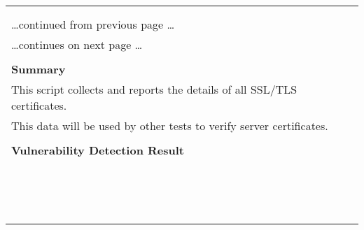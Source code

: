 \documentclass{article}
\begin{document}
\begin{longtable}{|p{}|}
\hline
\rowcolor{gvm_log}{\color{white}{Log (CVSS: 0.0) }}\\
\rowcolor{gvm_log}{\color{white}{NVT: SSL/TLS: Collect and Report Certificate Details}}\\
\hline
\endfirsthead
\hfill\ldots continued from previous page \ldots \\
\hline
\endhead
\hline
\ldots continues on next page \ldots \\
\endfoot
\hline
\endlastfoot
\\
\textbf{Summary}\\
This script collects and reports the details of all SSL/TLS
  certificates.\\
  This data will be used by other tests to verify server certificates.\\

        \hline
        \\
\textbf{Vulnerability Detection Result}\\
\rowcolor{white}{\verb=The following certificate details of the remote service were collected.=}\\
\rowcolor{white}{\verb=Certificate details:=}\\
\rowcolor{white}{\verb=fingerprint (SHA-1)             | DA9C7CB3E91B933B84FD4B8A51B0CF8C35763F02=}\\
\rowcolor{white}{\verb=fingerprint (SHA-256)           | 61FF73A8F85051B08467B262445A409CB9877252E66D0B=}\\
\rowcolor{white}{$\hookrightarrow$\verb=88C9EBDB01108D824E=}\\
\rowcolor{white}{\verb=issued by                       | C=\verb-=-\verb=DE,L=\verb-=-\verb=Osnabrueck,O=\verb-=-\verb=GVM Users,OU=\verb-=-\verb=Certificate A=}\\
\rowcolor{white}{$\hookrightarrow$\verb=uthority for 48f7b451fe6e=}\\
\rowcolor{white}{\verb=public key algorithm            | RSA=}\\
\rowcolor{white}{\verb=public key size (bits)          | 3072=}\\
\rowcolor{white}{\verb=serial                          | 2E9E3F1D5036BD870DBD2CCEF0748CC40AA6EA47=}\\
\rowcolor{white}{\verb=signature algorithm             | sha256WithRSAEncryption=}\\
\rowcolor{white}{\verb=subject                         | C=\verb-=-\verb=DE,L=\verb-=-\verb=Osnabrueck,O=\verb-=-\verb=GVM Users,CN=\verb-=-\verb=48f7b451fe6e=}\\
\rowcolor{white}{\verb=subject alternative names (SAN) | None=}\\
\rowcolor{white}{\verb=valid from                      | 2022-03-22 09:55:11 UTC=}\\
\rowcolor{white}{\verb=valid until                     | 2024-03-21 09:55:11 UTC=}\\


\end{longtable}
\end{document}
